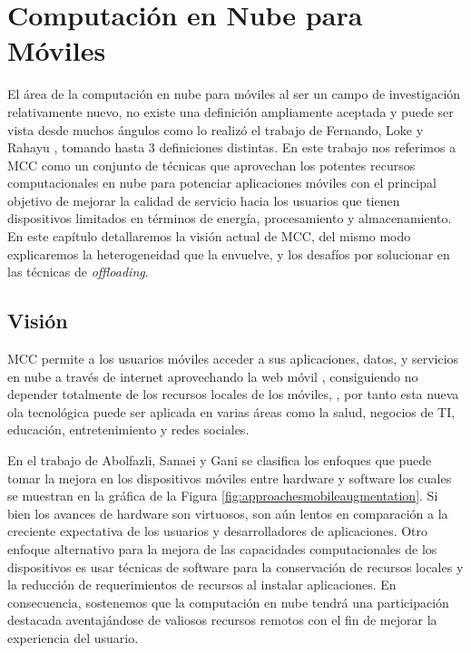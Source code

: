 
\chapter{Computación en Nube para Móviles} %

\label{Chapter3} %



El área de la computación en nube para móviles al ser un campo de investigación relativamente nuevo, no existe una definición
ampliamente aceptada y puede ser vista desde muchos ángulos como lo realizó el trabajo de  Fernando, Loke y Rahayu 
\cite{fernando2013mobile}, tomando hasta 3 definiciones distintas. En este trabajo nos referimos a MCC como un conjunto de técnicas que 
aprovechan los potentes recursos computacionales en nube para potenciar aplicaciones móviles con el principal objetivo de mejorar la calidad de 
servicio hacia los usuarios que tienen dispositivos limitados en términos de energía, procesamiento y almacenamiento. En este capítulo
detallaremos la visión actual de MCC, del mismo modo explicaremos la heterogeneidad que la envuelve,
y los desafíos por solucionar en las técnicas de \textit{offloading}.

\section{Visión}

MCC permite a los usuarios móviles acceder a sus aplicaciones, datos, y servicios en nube a través de internet aprovechando 
la web móvil \cite{dinh2013survey}, consiguiendo no depender totalmente de los recursos locales de los móviles,
, por tanto esta nueva ola tecnológica puede ser aplicada en varias áreas como la salud, negocios de TI, educación,
entretenimiento y redes sociales. 

En el trabajo de Abolfazli, Sanaei y Gani \cite{abolfazli2012mobile} se clasifica los enfoques
que puede tomar la mejora en los dispositivos móviles entre hardware y software los cuales se muestran en la gráfica de la Figura
\ref{fig:approachesmobileaugmentation}.  Si bien los avances de hardware son virtuosos, son aún lentos en comparación a la creciente 
expectativa de los usuarios y desarrolladores de aplicaciones. Otro enfoque alternativo para la mejora de las capacidades computacionales 
de los dispositivos es usar técnicas de software 
para la conservación de recursos
locales y la reducción de requerimientos de recursos al instalar aplicaciones. En consecuencia, sostenemos que la computación en nube 
tendrá una participación
destacada aventajándose de valiosos recursos remotos con el fin de mejorar la experiencia del usuario.

